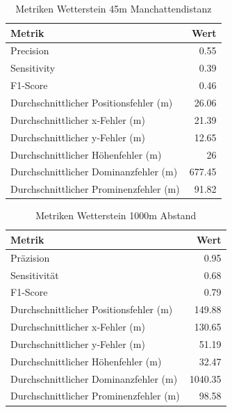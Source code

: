 \begin{table}[htbp]
\centering
\caption{Metriken Wetterstein 45m Manchattendistanz}
\label{tab:metrics_45m_square}
\begin{tabular}{|l|r|}
\hline
Metrik & Wert \\
\hline
Precision & 0.55 \\
\hline
Sensitivity & 0.39 \\
\hline
F1-Score & 0.46 \\
\hline
Durchschnittlicher Positionsfehler (m) & 26.06 \\
\hline
Durchschnittlicher x-Fehler (m) & 21.39 \\
\hline
Durchschnittlicher y-Fehler (m) & 12.65 \\
\hline
Durchschnittlicher Höhenfehler (m) & 26 \\
\hline
Durchschnittlicher Dominanzfehler (m) & 677.45 \\
\hline
Durchschnittlicher Prominenzfehler (m) & 91.82 \\
\hline
\end{tabular}
\end{table}

\begin{table}[htbp]
\centering
\caption{Metriken Wetterstein 1000m Abstand}
\label{tab:metrics_1000m_circular}
\begin{tabular}{|l|r|}
\hline
Metrik & Wert \\
\hline
Präzision & 0.95 \\
\hline
Sensitivität & 0.68 \\
\hline
F1-Score & 0.79 \\
\hline
Durchschnittlicher Positionsfehler (m) & 149.88 \\
\hline
Durchschnittlicher x-Fehler (m) & 130.65 \\
\hline
Durchschnittlicher y-Fehler (m) & 51.19 \\
\hline
Durchschnittlicher Höhenfehler (m) & 32.47 \\
\hline
Durchschnittlicher Dominanzfehler (m) & 1040.35 \\
\hline
Durchschnittlicher Prominenzfehler (m) & 98.58 \\
\hline
\end{tabular}
\end{table}


